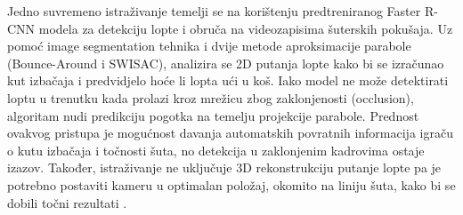 \documentclass[zavrsnirad]{fer}
\begin{document}
Jedno suvremeno istraživanje temelji se na korištenju predtreniranog Faster R-CNN modela za detekciju lopte i obruča na videozapisima šuterskih pokušaja. 
Uz pomoć image segmentation tehnika i dvije metode aproksimacije parabole (Bounce-Around i SWISAC), analizira se 2D putanja lopte kako bi se izračunao kut izbačaja i predvidjelo hoće li lopta ući u koš. 
Iako model ne može detektirati loptu u trenutku kada prolazi kroz mrežicu zbog zaklonjenosti (occlusion), algoritam nudi predikciju pogotka na temelju projekcije parabole. 
Prednost ovakvog pristupa je mogućnost davanja automatskih povratnih informacija igraču o kutu izbačaja i točnosti šuta, no detekcija u zaklonjenim kadrovima ostaje izazov.
Također, istraživanje ne uključuje 3D rekonstrukciju putanje lopte pa je potrebno postaviti kameru u optimalan položaj, okomito na liniju šuta, kako bi se dobili točni rezultati \cite{10937574}.
\end{document}
